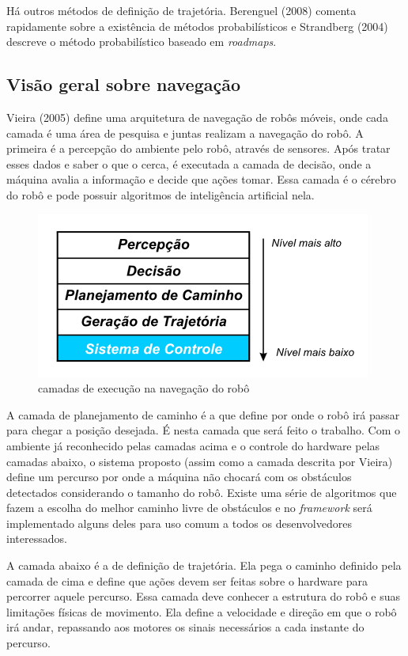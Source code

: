 Há outros métodos de definição de trajetória. Berenguel (2008) comenta rapidamente sobre a existência de métodos probabilísticos e Strandberg (2004) descreve o método probabilístico baseado em \textit{roadmaps}.

\subsection{Visão geral sobre navegação}

Vieira (2005) define uma arquitetura de navegação de robôs móveis, onde cada camada é uma área de pesquisa e juntas realizam a navegação do robô. A primeira é a percepção do ambiente pelo robô, através de sensores. Após tratar esses dados e saber o que o cerca, é executada a camada de decisão, onde a máquina avalia a informação e decide que ações tomar. Essa camada é o cérebro do robô e pode possuir algoritmos de inteligência artificial nela.

\begin{figure}[h]
	\centering
	\label{fig04}
		\includegraphics[keepaspectratio=true,scale=1]{figuras/arqRoboMoveis0.png}
	\caption{camadas de execução na navegação do robô}
\end{figure}

A camada de planejamento de caminho é a que define por onde o robô irá passar para chegar a posição desejada. É nesta camada que será feito o trabalho. Com o ambiente já reconhecido pelas camadas acima e o controle do hardware pelas camadas abaixo, o sistema proposto (assim como a camada descrita por Vieira) define um percurso por onde a máquina não chocará com os obstáculos detectados considerando o tamanho do robô. Existe uma série de algoritmos que fazem a  escolha do melhor caminho livre de obstáculos e no \textit{framework} será implementado alguns deles para uso comum a todos os desenvolvedores interessados.

A camada abaixo é a de definição de trajetória. Ela pega o caminho definido pela camada de cima e define que ações devem ser feitas sobre o hardware para percorrer aquele percurso. Essa camada deve conhecer a estrutura do robô e suas limitações físicas de movimento. Ela define a velocidade e direção em que o robô irá andar, repassando aos motores os sinais necessários a cada instante do percurso. 

